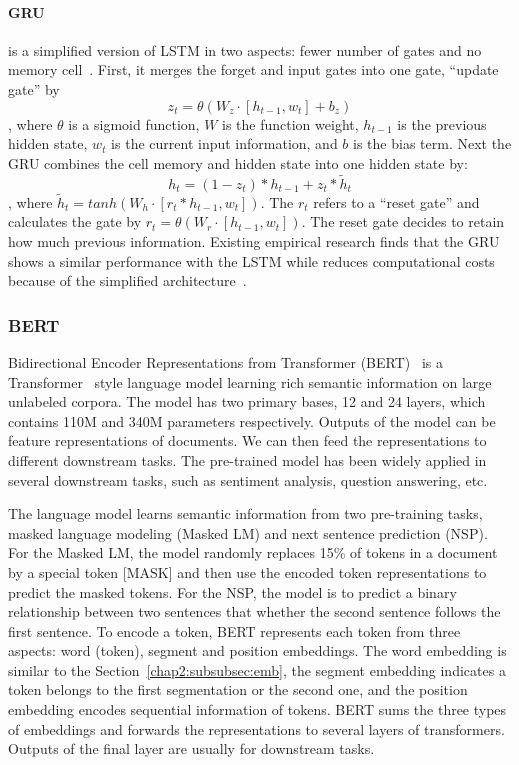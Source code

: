 \paragraph{GRU} is a simplified version of LSTM in two aspects: fewer number of gates and no memory cell~\cite{chung2014empirical}.
First, it merges the forget and input gates into one gate, ``update gate'' by
$$z_t = \theta(W_z \cdot [h_{t-1}, w_t] + b_z)$$
, where $\theta$ is a sigmoid function, $W$ is the function weight, $h_{t-1}$ is the previous hidden state, $w_t$ is the current input information, and $b$ is the bias term.
Next the GRU combines the cell memory and hidden state into one hidden state by:
$$h_t = (1-z_t) * h_{t-1} + z_t * \tilde{h}_t$$
, where $\tilde{h}_t = tanh(W_h \cdot [r_t * h_{t-1}, w_t])$.
The $r_t$ refers to a ``reset gate'' and calculates the gate by $r_t = \theta(W_r \cdot [h_{t-1}, w_t])$.
The reset gate decides to retain how much previous information.
Existing empirical research finds that the GRU shows a similar performance with the LSTM while reduces computational costs because of the simplified architecture~\cite{chung2014empirical}.


\subsubsection{BERT} 
Bidirectional Encoder Representations from Transformer (BERT)~\cite{devlin2019bert} is a Transformer~\cite{vaswani2017attention} style language model learning rich semantic information on large unlabeled corpora.
The model has two primary bases, 12 and 24 layers, which contains 110M and 340M parameters respectively.
Outputs of the model can be feature representations of documents.
We can then feed the representations to different downstream tasks.
The pre-trained model has been widely applied in several downstream tasks, such as sentiment analysis, question answering, etc.

The language model learns semantic information from two pre-training tasks, masked language modeling (Masked LM) and next sentence prediction (NSP). 
For the Masked LM, the model randomly replaces 15\% of tokens in a document by a special token [MASK] and then use the encoded token representations to predict the masked tokens.
For the NSP, the model is to predict a binary relationship between two sentences that whether the second sentence follows the first sentence.
To encode a token, BERT represents each token from three aspects: word (token), segment and position embeddings.
The word embedding is similar to the Section~\ref{chap2:subsubsec:emb}, the segment embedding indicates a token belongs to the first segmentation or the second one, and the position embedding encodes sequential information of tokens.
BERT sums the three types of embeddings and forwards the representations to several layers of transformers.
Outputs of the final layer are usually for downstream tasks.


